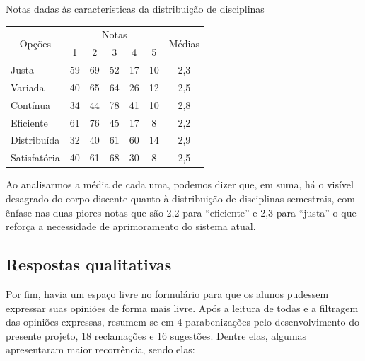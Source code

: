 \begin{apendicesenv}
  \begin{CenteredTable} \caption{Notas dadas às características da distribuição de disciplinas} \label{table:6.0-Opiniao}
    \begin{tabular}{| l | c c c c c | c |}
      \hline
      \multicolumn{1}{|c|}{\multirow{2}{*}{Opções}} &
      \multicolumn{5}{c|}{Notas}                    &
      \multicolumn{1}{|c|}{\multirow{2}{*}{Médias}}
      \\
      \multicolumn{1}{|c|}{}                        &
      \multicolumn{1}{c|}{1}                        &
      \multicolumn{1}{c|}{2}                        &
      \multicolumn{1}{c|}{3}                        &
      \multicolumn{1}{c|}{4}                        &
      \multicolumn{1}{c|}{5}                        &
      \multicolumn{1}{|c|}{}                                                       \\
      \hline
      Justa                                         & 59 & 69 & 52 & 17 & 10 & 2,3 \\
      Variada                                       & 40 & 65 & 64 & 26 & 12 & 2,5 \\
      Contínua                                      & 34 & 44 & 78 & 41 & 10 & 2,8 \\
      Eficiente                                     & 61 & 76 & 45 & 17 & 8  & 2,2 \\
      Distribuída                                   & 32 & 40 & 61 & 60 & 14 & 2,9 \\
      Satisfatória                                  & 40 & 61 & 68 & 30 & 8  & 2,5 \\
      \hline
    \end{tabular}
  \end{CenteredTable}

  Ao analisarmos a média de cada uma, podemos dizer que, em suma, há o visível desagrado do corpo discente quanto à distribuição de disciplinas semestrais, com ênfase nas duas piores notas que são 2,2 para ``eficiente'' e 2,3 para ``justa'' o que reforça a necessidade de aprimoramento do sistema atual.

  \subsection{Respostas qualitativas} %

  Por fim, havia um espaço livre no formulário para que os alunos pudessem expressar suas opiniões de forma mais livre. Após a leitura de todas e a filtragem das opiniões expressas, resumem-se em 4 parabenizações pelo desenvolvimento do presente projeto, 18 reclamações e 16 sugestões. Dentre elas, algumas apresentaram maior recorrência, sendo elas:


\end{apendicesenv}
